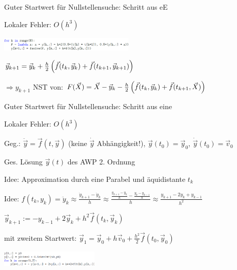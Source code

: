 Guter Startwert für Nullstellensuche: Schritt aus eE

\vspace{1\baselineskip}

Lokaler Fehler: $O(h^3)$

\begin{center}
    \includegraphics[width=0.48\textwidth]{Figures/iM.png}
\end{center}

\vspace{1\baselineskip}


$\vec{y}_{k+1} = \vec{y}_k + \frac{h}{2} \left( \vec{f}(t_k,\vec{y}_k) + \vec{f}(t_{k+1} , \vec{y}_{k+1}) \right)$

$\Rightarrow y_{k+1}$ NST von: $F(\vec{X}) = \vec{X} - \vec{y}_k - \frac{h}{2} \left( \vec{f}(t_k,\vec{y}_k) + \vec{f}(t_{k+1} , \vec{X}) \right)$

Guter Startwert für Nullstellensuche: Schritt aus eine

Lokaler Fehler: $O(h^3)$

\vspace{1\baselineskip}

\underline{}

Geg.: $\ddot{\vec{y}} = \vec{f}(t,\vec{y})$ (keine $\dot{\vec{y}}$ Abhängigkeit!),
$\vec{y} (t_0) = \vec{y}_0$, $\dot{\vec{y}}(t_0) = \vec{v}_0$

Ges. Lösung $\vec{y}(t)$ des AWP 2. Ordnung

\vspace{1\baselineskip}


Idee: Approximation durch eine Parabel und äquidistante $t_k$

Idee: $f(t_k , y_k) = \ddot{y}_k \approx \frac{\dot{y}_{k+1} - \dot{y}_k}{h} \approx
\frac{\frac{y_{k+1} - y_k}{h} - \frac{y_k - y_{k-1}}{h}}{h} \approx
\frac{y_{k+1} - 2 y_k + y_{k-1}}{h^2}$

$\vec{y}_{k+1} := - y_{k-1} + 2 \vec{y}_k + h^2 \vec{f}(t_k , \vec{y}_k)$

mit zweitem Startwert: $\vec{y}_1 = \vec{y}_0 + h \vec{v}_0 + \frac{h^2}{2} \vec{f}(t_0,\vec{y}_0)$

\begin{center}
    \includegraphics[width=0.35\textwidth]{Figures/ZSF.png}
\end{center}

